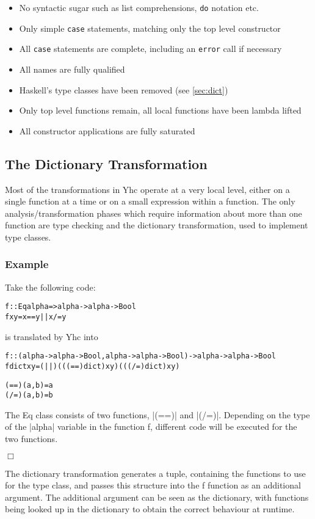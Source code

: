 \documentclass[preprint]{sigplanconf}
\newcommand{\T}[1]{\texttt{#1}}
\newcommand{\C}[1]{\textsf{#1}}
\newcounter{exmp}
\newcommand{\yesexample}{\subsubsection*{Example \arabic{exmp}}\addtocounter{exmp}{1}}
\newcommand{\noexample}{\hfill$\Box$}
\newenvironment{code}{\begin{alltt}\small}{\end{alltt}}
\begin{document}
\begin{itemize}
\item No syntactic sugar such as list comprehensions, \T{do} notation etc.
\item Only simple \T{case} statements, matching only the top level constructor
\item All \T{case} statements are complete, including an \T{error} call if necessary
\item All names are fully qualified
\item Haskell's type classes have been removed (see \ref{sec:dict})
\item Only top level functions remain, all local functions have been lambda lifted
\item All constructor applications are fully saturated
\end{itemize}

\subsection{The Dictionary Transformation}

Most of the transformations in Yhc operate at a very local level, either on a single function at a time or on a small expression within a function. The only analysis/transformation phases which require information about more than one function are type checking and the dictionary transformation, used to implement type classes.

\yesexample

Take the following code:

\begin{code}
f :: Eq alpha => alpha -> alpha -> Bool
f x y = x == y || x /= y
\end{code}

is translated by Yhc into

\begin{code}
f :: (alpha -> alpha -> Bool, alpha -> alpha -> Bool) -> alpha -> alpha -> Bool
f dict x y = (||) (((==) dict) x y) (((/=) dict) x y)

(==) (a,b) = a
(/=) (a,b) = b
\end{code}

The \C{Eq} class consists of two functions, |(==)| and |(/=)|. Depending on the type of the |alpha| variable in the function \C{f}, different code will be executed for the two functions.

\noexample

The dictionary transformation generates a tuple, containing the functions to use for the type class, and passes this structure into the \C{f} function as an additional argument. The additional argument can be seen as the dictionary, with functions being looked up in the dictionary to obtain the correct behaviour at runtime.
\end{document}
